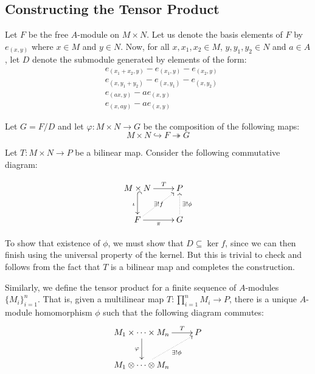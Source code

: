 \subsection*{Constructing the Tensor Product}

Let $F$ be the free $A$-module on $M\times N$. Let us denote the basis elements of $F$ by $e_{(x,y)}$ where $x\in M$ and $y\in N$. Now, for all $x,x_1,x_2\in M$, $y,y_1,y_2\in N$ and $a\in A$, let $D$ denote the submodule generated by elements of the form: 
\begin{align*}
    &e_{(x_1 + x_2, y)} - e_{(x_1,y)} - e_{(x_2,y)}\\
    &e_{(x,y_1 + y_2)} - e_{(x,y_1)} - e_{(x,y_2)}\\
    &e_{(ax,y)} - ae_{(x,y)}\\
    &e_{(x,ay)} - ae_{(x,y)}
\end{align*}

Let $G = F/D$ and let $\varphi: M\times N\to G$ be the composition of the following maps: 
\begin{equation*}
    M\times N\hookrightarrow F\twoheadrightarrow G
\end{equation*}

Let $T: M\times N\to P$ be a bilinear map. Consider the following commutative diagram: 

\begin{equation*}
\xymatrix {
    M\times N\ar[r]^-T\ar@{^{(}->}_{\iota}[d] & P\\
    F\ar[r]_{\pi}\ar@{.>}[ru]|{\exists! f} & G\ar@{.>}[u]_{\exists!\phi}
}
\end{equation*}

To show that existence of $\phi$, we must show that $D\subseteq\ker f$, since we can then finish using the universal property of the kernel. But this is trivial to check and follows from the fact that $T$ is a bilinear map and completes the construction.

\begin{mdframed}
    Similarly, we define the tensor product for a finite sequence of $A$-modules $\{M_i\}_{i = 1}^n$. That is, given a multilinear map $T:\prod\limits_{i = 1}^n M_i\to P$, there is a unique $A$-module homomorphism $\phi$ such that the following diagram commutes: 
    \begin{equation*}
    \xymatrix{
        M_1\times\cdots\times M_n\ar[r]^-T\ar[d]_\varphi & P\\
        M_1\otimes\cdots\otimes M_n\ar@{.>}[ru]_-{\exists!\phi}
    }
    \end{equation*}
\end{mdframed}

